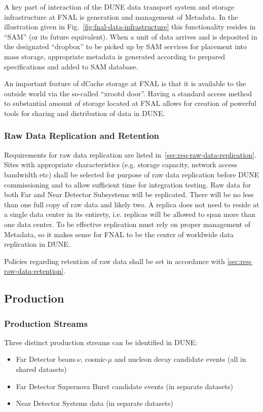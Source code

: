 \noindent
A key part of interaction of the DUNE data transport system and storage infrastructure at FNAL is generation and management of
Metadata. In the illustration given in Fig.~\ref{fig:fnal-data-infrastructure} this functionality resides in ``SAM'' (or its future equivalent).
When a unit of data arrives and is deposited in the designated ``dropbox'' to be picked up by SAM services for placement into mass storage,
appropriate metadata is generated according to prepared specifications and added to SAM database.

An important feature of dCache storage at FNAL is that it is available to the outside world via the so-called ``xrootd door''. Having a standard
access method to substantial amount of storage located at FNAL allows for creation of powerful tools for sharing and distribution of data in DUNE.

\subsubsection{Raw Data Replication and Retention}
Requirements for raw data replication are listed in~\ref{sec:req-raw-data-replication}. Sites with appropriate characteristics
(e.g. storage capacity, network access bandwidth etc) shall be selected for purpose of raw data replication before DUNE
commissioning and to allow sufficient time for integration testing.
Raw data for both Far and Near Detector Subsystems will be replicated. There will be no less than one full copy of raw
data and likely two. A replica does not need to reside at a single data center in its entirety, i.e. replicas will be allowed to span
more than one data center. To be effective replication must rely on proper management of Metadata, so it makes sense
for FNAL to be the center of worldwide data replication in DUNE.

Policies regarding retention of raw data shall be set in accordance with \ref{sec:req-raw-data-retention}.

\subsection{Production}
\subsubsection{Production Streams}
Three distinct production streams can be identified in DUNE:
\begin{itemize}
\item Far Detector beam-$\nu$, cosmic-$\mu$ and nucleon decay candidate events (all in shared datasets)

\item Far Detector Supernova Burst candidate events (in separate datasets)

\item Near Detector Systems data (in separate datasets)
\end{itemize}

